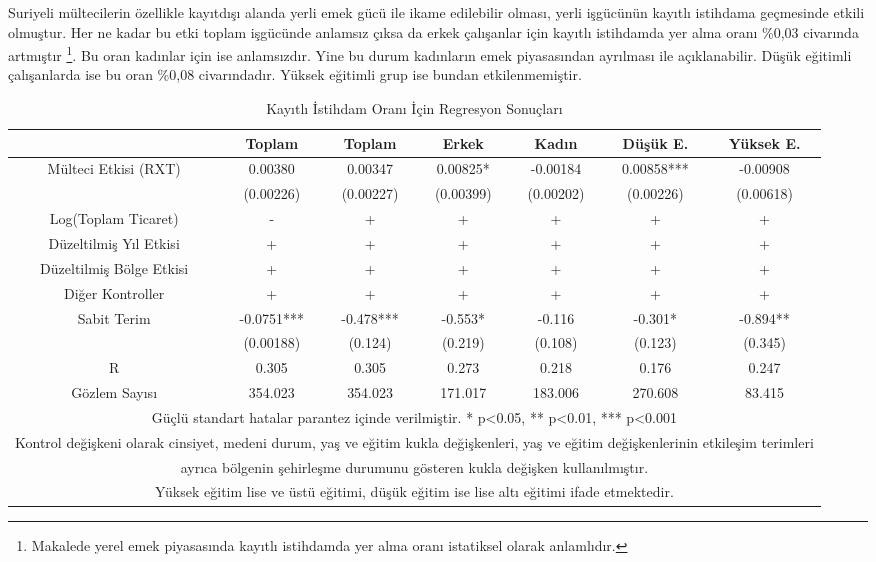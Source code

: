 \documentclass{article}
\begin{document}
\begin{justify}
        Suriyeli mültecilerin özellikle kayıtdışı alanda yerli emek gücü ile ikame edilebilir olması,
        yerli işgücünün kayıtlı istihdama geçmesinde etkili olmuştur. Her ne kadar bu etki toplam işgücünde 
        anlamsız çıksa da erkek çalışanlar için kayıtlı istihdamda yer alma oranı \%0,03 civarında artmıştır 
        \footnote{Makalede yerel emek piyasasında kayıtlı istihdamda yer alma oranı istatiksel olarak anlamlıdır.}. 
        Bu oran kadınlar için ise anlamsızdır. Yine bu durum kadınların emek piyasasından ayrılması ile açıklanabilir. 
        Düşük eğitimli çalışanlarda ise bu oran \%0,08 civarındadır.
        Yüksek eğitimli grup ise bundan etkilenmemiştir.


        \FloatBarrier
        \begin{table}[h]
            \centering
            \caption{Kayıtlı İstihdam Oranı İçin Regresyon Sonuçları}
            \begin{tabular}{|ccccccc|}
                \hline
                    & Toplam & Toplam & Erkek & Kadın & Düşük E. & Yüksek E. \\ \hline
                    Mülteci Etkisi (RXT) & 0.00380 & 0.00347 & 0.00825* & -0.00184 & 0.00858*** & -0.00908    \\ 
                    & (0.00226) & (0.00227) & (0.00399) & (0.00202) & (0.00226) & (0.00618)    \\ 
                    Log(Toplam Ticaret) & - & + & + & + & + & + \\ 
                    Düzeltilmiş Yıl Etkisi & + & + & + & + & + & + \\ 
                    Düzeltilmiş Bölge Etkisi & + & + & + & + & + & + \\ 
                    Diğer Kontroller & + & + & + & + & + & + \\
                    Sabit Terim & -0.0751*** & -0.478*** & -0.553* & -0.116 & -0.301* & -0.894**  \\ 
                    & (0.00188) & (0.124) & (0.219) & (0.108) & (0.123) & (0.345)    \\ 
                    R & 0.305 & 0.305 & 0.273 & 0.218 & 0.176 & 0.247    \\ 
                    Gözlem Sayısı & 354.023 & 354.023 & 171.017 & 183.006 & 270.608 & 83.415 \\ \hline
                    \multicolumn{7}{|c|}{\scriptsize Güçlü standart hatalar parantez içinde verilmiştir.   * p<0.05, ** p<0.01, *** p<0.001}\\ \hline
                    \multicolumn{7}{|c|}{\scriptsize Kontrol değişkeni olarak cinsiyet, medeni durum, yaş ve eğitim kukla değişkenleri, yaş ve eğitim değişkenlerinin etkileşim terimleri} \\ 
                    \multicolumn{7}{|c|}{\scriptsize ayrıca bölgenin şehirleşme durumunu gösteren kukla değişken kullanılmıştır.} \\ \hline
                    \multicolumn{7}{|c|}{\scriptsize Yüksek eğitim lise ve üstü eğitimi, düşük eğitim ise lise altı eğitimi ifade etmektedir.} \\ \hline


\end{tabular}
\end{table}
\end{justify}
\end{document}
